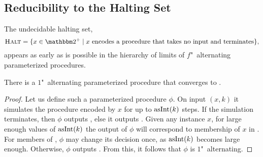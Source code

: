 \subsection{Reducibility to the Halting Set}
\label{sec:computability:halt}%
The undecidable halting set,
\begin{equation*}
  \pr{Halt} \deq \{x \in \binary^+ \st \text{$x$ encodes a procedure that takes no input and terminates}\},
\end{equation*}
appears as early as is possible in the hierarchy of limits of $f$"~alternating parameterized procedures.
\begin{lemma}
\label{lem:one_halting}%
  There is a $1$"~alternating parameterized procedure that converges to .
\end{lemma}
\begin{proof}
  Let us define such a parameterized procedure $\phi$.
  On input $(x, k)$ it simulates the procedure encoded by $x$ for up to $\operatorname{asInt}(k)$ steps.
  If the simulation terminates, then $\phi$ outputs , else it outputs .
  Given any instance $x$, for large enough values of $\operatorname{asInt}(k)$ the output of $\phi$ will correspond to membership of $x$ in .
  For members of , $\phi$ may change its decision once, as $\operatorname{asInt}(k)$ becomes large enough.
  Otherwise, $\phi$ outputs .
  From this, it follows that $\phi$ is $1$"~alternating.
\end{proof}


